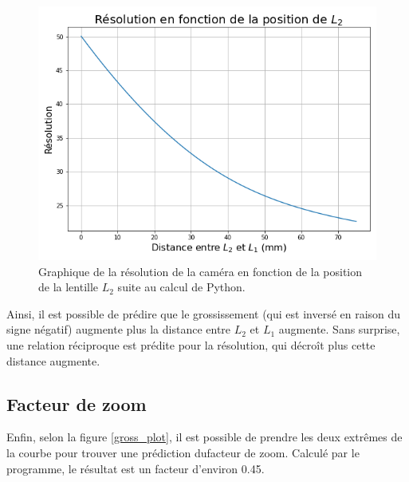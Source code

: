 \documentclass[11pt,letterpaper]{article}
\begin{document}
\begin{figure}[H]
  \centering
  \includegraphics[scale=0.55]{Resolution.png}
  \caption{Graphique de la résolution de la caméra en fonction de la position de la lentille
  $L_2$ suite au calcul de Python.}
  \label{res_plot}
\end{figure}

Ainsi, il est possible de prédire que le grossissement (qui est inversé en raison du signe 
négatif) augmente plus la distance entre $L_2$ et $L_1$ augmente. Sans surprise, une relation 
réciproque est prédite pour la résolution, qui décroît plus cette distance augmente.

\subsection{Facteur de zoom}

Enfin, selon la figure \ref{gross_plot}, il est possible de prendre les deux extrêmes de la courbe 
pour trouver une prédiction dufacteur de zoom. Calculé par le programme, le résultat est un facteur
d'environ 0.45.
\clearpage

% 
% 
\end{document}
